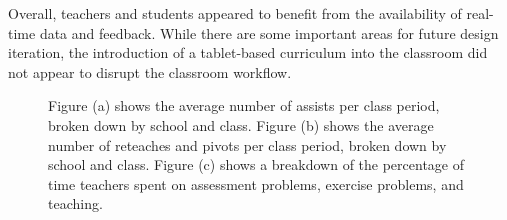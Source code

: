 \documentclass{sigchi}
\begin{document}
Overall, teachers and students appeared to benefit from the availability of real-time data and feedback. While there are some important areas for future design iteration, the introduction of a tablet-based curriculum into the classroom did not appear to disrupt the classroom workflow.

\begin{figure}[t]
\centering
{} \hspace{0.5em}%
 \hspace{0.5em}%
 \hspace{0.5em}%
\caption{
Figure (a) shows the average number of assists per class period, broken down by school and class. Figure (b) shows the average number of reteaches and pivots per class period, broken down by school and class. Figure (c) shows a breakdown of the percentage of time teachers spent on assessment problems, exercise problems, and teaching.}
\label{fig:Spreadsheet}
\end{figure}
\end{document}
